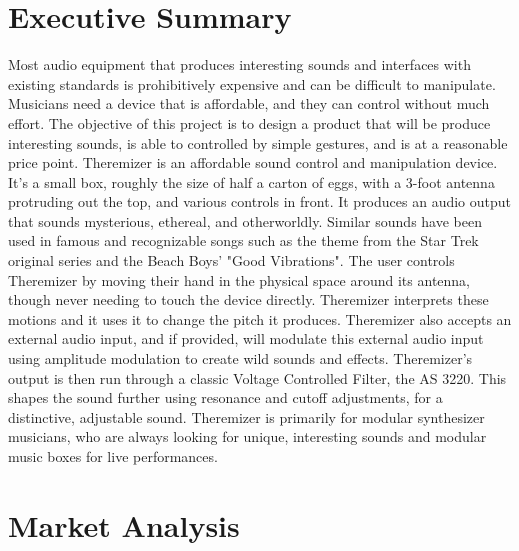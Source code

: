 \documentclass[a4paper,12pt]{article}
\begin{document}




\newpage
{}

	\section*{Executive Summary}
	Most audio equipment that produces interesting sounds and interfaces with existing standards is prohibitively expensive and can be difficult to manipulate. Musicians need a device that is affordable, and they can control without much effort. The objective of this project is to design a product that will be produce interesting sounds, is able to controlled by simple gestures, and is at a reasonable price point. Theremizer is an affordable sound control and manipulation device. It's a small box, roughly the size of half a carton of eggs, with a 3-foot antenna protruding out the top, and various controls in front. It produces an audio output that sounds mysterious, ethereal, and otherworldly. Similar sounds have been used in famous and recognizable songs such as the theme from the Star Trek original series and the Beach Boys' "Good Vibrations". The user controls Theremizer by moving their hand in the physical space around its antenna, though never needing to touch the device directly. Theremizer interprets these motions and it uses it to change the pitch it produces. Theremizer also accepts an external audio input, and if provided, will modulate this external audio input using amplitude modulation to create wild sounds and effects. Theremizer's output is then run through a classic Voltage Controlled Filter, the AS 3220. This shapes the sound further using resonance and cutoff adjustments, for a distinctive, adjustable sound. Theremizer is primarily for modular synthesizer musicians, who are always looking for unique, interesting sounds and modular music boxes for live performances.
	\section*{Market Analysis}
\end{document}
